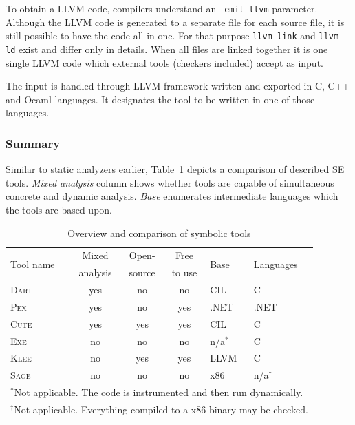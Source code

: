 \documentclass[11pt,a4paper]{article}
\begin{document}
To obtain a LLVM code, compilers understand an \texttt{--emit-llvm} parameter.
Although the LLVM code is generated to a separate file for each source file,
it is still possible to have the code all-in-one. For that purpose
\texttt{llvm-link} and \texttt{llvm-ld} exist and differ only in details.
When all files are linked together it is one single LLVM code which external
tools (checkers included) accept as input.

The input is handled through LLVM framework written and exported in C,
C++ and Ocaml languages. It designates the tool to be written in one of
those languages.

\subsubsection{Summary}
Similar to static analyzers earlier, Table~\ref{fig_se_comparison} depicts a
comparison of described SE tools. \emph{Mixed analysis} column shows whether
tools are capable of simultaneous concrete and dynamic analysis. \emph{Base}
enumerates intermediate languages which the tools are based upon.

\begin{table}[htb]
\begin{center}
\begin{tabular}{l|cccll}
\multirow{2}{*}{Tool name} &
Mixed &
Open- &
Free &
\multirow{2}{*}{Base} &
\multirow{2}{*}{Languages} \\
	      & analysis & source & to use &        & \\ \hline
\textsc{Dart} & yes      & no     & no   & CIL~\cite{cil} & C \\
\textsc{Pex}  & yes      & no     & yes  & .NET   & .NET \\
\textsc{Cute} & yes      & yes    & yes  & CIL    & C \\
\textsc{Exe}  & no       & no     & no   & n/a$^*$ & C \\
\textsc{Klee} & no       & yes    & yes  & LLVM   & C \\
\textsc{Sage} & no       & no     & no   & x86    & n/a$^\dagger$ \\
\hline
\multicolumn{6}{l}{\footnotesize $^*$Not applicable. The code is
instrumented and then run dynamically.} \\
\multicolumn{6}{l}{\footnotesize $^\dagger$Not applicable. Everything compiled
to a x86 binary may be checked.}
\end{tabular}
\caption{Overview and comparison of symbolic tools}
\label{fig_se_comparison}
\end{center}
\end{table}
\end{document}
